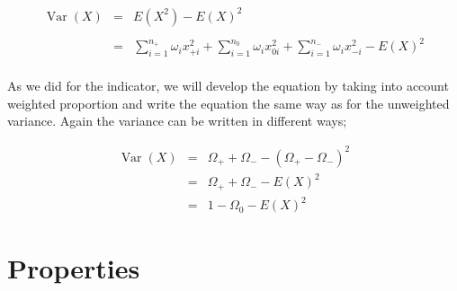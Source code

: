 \documentclass[12pt,a4paper,oneside]{book}
\DeclareMathOperator{\Var}{Var}
\begin{document}
\begin{eqnarray}
\Var(X) &=&  E\left( X^2\right) - E\left( X\right)^2 \nonumber \\ \nonumber \\
    &=& \sum_{i=1}^{n_+} \omega_i x_{+i}^2 + \sum_{i=1}^{n_0} \omega_i x_{0i}^2  + \sum_{i=1}^{n_-} \omega_i x_{-i}^2 - E(X)^2 \nonumber \\
\end{eqnarray}

As we did for the indicator, we will develop the equation by taking into account weighted proportion and write the equation the same way as for the unweighted variance. 
Again the variance can be written in different ways;

\begin{eqnarray}
\Var(X) &=& \Omega_+ + \Omega_- - ( \Omega_+ - \Omega_- )^2 \\
    &=& \Omega_+ + \Omega_- - E ( X )^2 \\
    &=& 1 - \Omega_{0} - E(X)^2 \label{eq:var3 weighted}
\end{eqnarray}


\section{Properties}
    \label{sec:properties variance}
\end{document}
